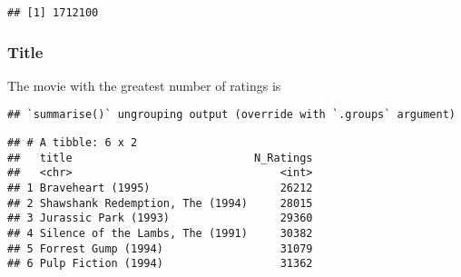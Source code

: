\documentclass[
]{article}
\newenvironment{Shaded}{\begin{snugshade}}{\end{snugshade}}
\newcommand{\KeywordTok}[1]{\textcolor[rgb]{0.13,0.29,0.53}{\textbf{#1}}}
\newcommand{\NormalTok}[1]{#1}
\newcommand{\OperatorTok}[1]{\textcolor[rgb]{0.81,0.36,0.00}{\textbf{#1}}}
\newcommand{\StringTok}[1]{\textcolor[rgb]{0.31,0.60,0.02}{#1}}
\begin{document}
\begin{verbatim}
## [1] 1712100
\end{verbatim}

\hypertarget{title}{%
\subsubsection{Title}\label{title}}

The movie with the greatest number of ratings is

\begin{Shaded}
\end{Shaded}

\begin{verbatim}
## `summarise()` ungrouping output (override with `.groups` argument)
\end{verbatim}

\begin{verbatim}
## # A tibble: 6 x 2
##   title                            N_Ratings
##   <chr>                                <int>
## 1 Braveheart (1995)                    26212
## 2 Shawshank Redemption, The (1994)     28015
## 3 Jurassic Park (1993)                 29360
## 4 Silence of the Lambs, The (1991)     30382
## 5 Forrest Gump (1994)                  31079
## 6 Pulp Fiction (1994)                  31362
\end{verbatim}
\end{document}
